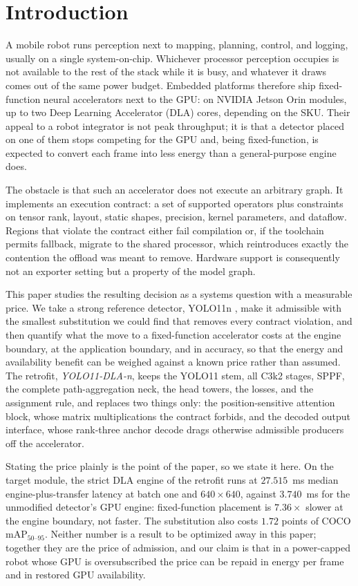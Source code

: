 \section{Introduction}
\label{sec:introduction}

A mobile robot runs perception next to mapping, planning, control, and logging,
usually on a single system-on-chip. Whichever processor perception occupies is
not available to the rest of the stack while it is busy, and whatever it draws
comes out of the same power budget. Embedded platforms therefore ship
fixed-function neural accelerators next to the GPU: on NVIDIA Jetson Orin
modules, up to two Deep Learning Accelerator (DLA) cores, depending on the SKU. Their appeal to a robot
integrator is not peak throughput; it is that a detector placed on one of them
stops competing for the GPU and, being fixed-function, is expected to convert
each frame into less energy than a general-purpose engine does.

The obstacle is that such an accelerator does not execute an arbitrary graph. It
implements an execution contract: a set of supported operators plus constraints
on tensor rank, layout, static shapes, precision, kernel parameters, and
dataflow. Regions that violate the contract either fail compilation or, if the
toolchain permits fallback, migrate to the shared processor, which reintroduces
exactly the contention the offload was meant to remove. Hardware support is
consequently not an exporter setting but a property of the model graph.

This paper studies the resulting decision as a systems question with a
measurable price. We take a strong reference detector, YOLO11n
\cite{jocher2024yolo11}, make it admissible with the smallest substitution we
could find that removes every contract violation, and then quantify what the
move to a fixed-function accelerator costs at the engine boundary, at the
application boundary, and in accuracy, so that the energy and availability
benefit can be weighed against a known price rather than assumed. The retrofit,
\emph{YOLO11-DLA-n}, keeps the YOLO11 stem, all C3k2 stages, SPPF, the complete
path-aggregation neck, the head towers, the losses, and the assignment rule, and
replaces two things only: the position-sensitive attention block, whose matrix
multiplications the contract forbids, and the decoded output interface, whose
rank-three anchor decode drags otherwise admissible producers off the
accelerator.

Stating the price plainly is the point of the paper, so we state it here. On the
target module, the strict DLA engine of the retrofit runs at $27.515$~ms median
engine-plus-transfer latency at batch one and $640\times640$, against $3.740$~ms
for the unmodified detector's GPU engine: fixed-function placement is
$7.36\times$ slower at the engine boundary, not faster. The substitution also
costs $1.72$ points of COCO $\mathrm{mAP}_{50\text{--}95}$. Neither number is a
result to be optimized away in this paper; together they are the price of
admission, and our claim is that in a power-capped robot whose GPU is
oversubscribed the price can be repaid in energy per frame and in restored GPU
availability.


